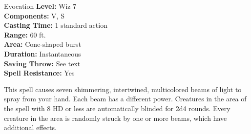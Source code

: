 {Evocation}
{
	\textbf{Level:}
	Wiz 7\\
	\textbf{Components:}
	V, S\\
	\textbf{Casting Time:}
	1 standard action\\
	\textbf{Range:}
	60 ft.\\
	\textbf{Area:}
	Cone-shaped burst\\
	\textbf{Duration:}
	Instantaneous\\
	\textbf{Saving Throw:}
	See text\\
	\textbf{Spell Resistance:}
	Yes\\
}
{
	This spell causes seven shimmering, intertwined, multicolored beams of light to spray from your hand. Each beam has a different power. Creatures in the area of the spell with 8 HD or less are automatically blinded for 2d4 rounds. Every creature in the area is randomly struck by one or more beams, which have additional effects.



}
